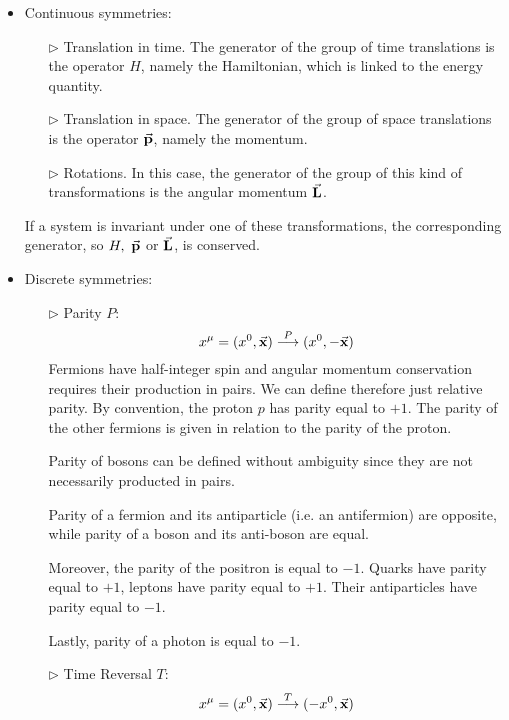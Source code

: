 \documentclass[../../main/main.tex]{subfiles}
\begin{document}
\begin{itemize}
    \item Continuous symmetries:
    \begin{itemize}
        \item[\(\triangleright\)] Translation in time. The generator of the group of time translations is the operator \( H \), namely the Hamiltonian, which is linked to the energy quantity.
        \item[\(\triangleright\)] Translation in space. The generator of the group of space translations is the operator \( \va{p} \), namely the momentum.
        \item[\(\triangleright\)] Rotations. In this case, the generator of the group of this kind of transformations is the angular momentum \( \va{L} \).
    \end{itemize}
    If a system is invariant under one of these transformations, the corresponding generator, so \( H, \ \va{p} \) or \( \va{L} \), is conserved.

    \item Discrete symmetries:
    \begin{itemize}
        \item[\(\triangleright\)] Parity \( P \):
            \begin{equation}
                x^{\mu} = (x^0, \va{x}) \overset{P}{\longrightarrow} (x^0, - \va{x})
                \label{eq:L01_PDS}
            \end{equation}
            Fermions have half-integer spin and angular momentum conservation requires their production in pairs. We can define therefore just relative parity. By convention, the proton \( p \) has parity equal to \( +1 \). The parity of the other fermions is given in relation to the parity of the proton.

            Parity of bosons can be defined without ambiguity since they are not necessarily producted in pairs.

            Parity of a fermion and its antiparticle (i.e. an antifermion) are opposite, while parity of a boson and its anti-boson are equal.

            Moreover, the parity of the positron is equal to \( -1 \). Quarks have parity equal to \( +1 \), leptons have parity equal to \( +1 \). Their antiparticles have parity equal to \( -1 \).

            Lastly, parity of a photon is equal to \( -1 \).

        \item[\(\triangleright\)] Time Reversal \( T \):
            \begin{equation}
                x^{\mu} = (x^0, \va{x}) \overset{T}{\longrightarrow} (- x^0, \va{x})
                \label{eq:L01_TRDS}
            \end{equation}


\end{itemize}
\end{itemize}
\end{document}
